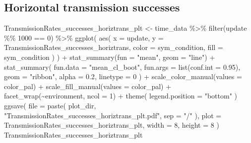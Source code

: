 \documentclass[
]{book}
\newenvironment{Shaded}{\begin{snugshade}}{\end{snugshade}}
\newcommand{\AttributeTok}[1]{\textcolor[rgb]{0.77,0.63,0.00}{#1}}
\newcommand{\DecValTok}[1]{\textcolor[rgb]{0.00,0.00,0.81}{#1}}
\newcommand{\FloatTok}[1]{\textcolor[rgb]{0.00,0.00,0.81}{#1}}
\newcommand{\FunctionTok}[1]{\textcolor[rgb]{0.00,0.00,0.00}{#1}}
\newcommand{\NormalTok}[1]{#1}
\newcommand{\OtherTok}[1]{\textcolor[rgb]{0.56,0.35,0.01}{#1}}
\newcommand{\SpecialCharTok}[1]{\textcolor[rgb]{0.00,0.00,0.00}{#1}}
\newcommand{\StringTok}[1]{\textcolor[rgb]{0.31,0.60,0.02}{#1}}
\begin{document}
\hypertarget{horizontal-transmission-successes-2}{%
\subsection{Horizontal transmission successes}\label{horizontal-transmission-successes-2}}

\begin{Shaded}
\begin{Highlighting}[]
\NormalTok{TransmissionRates\_successes\_horiztrans\_plt }\OtherTok{\textless{}{-}}\NormalTok{ time\_data }\SpecialCharTok{\%\textgreater{}\%}
  \FunctionTok{filter}\NormalTok{(update }\SpecialCharTok{\%\%} \DecValTok{1000} \SpecialCharTok{==} \DecValTok{0}\NormalTok{) }\SpecialCharTok{\%\textgreater{}\%}
  \FunctionTok{ggplot}\NormalTok{(}
    \FunctionTok{aes}\NormalTok{(}
      \AttributeTok{x =}\NormalTok{ update,}
      \AttributeTok{y =}\NormalTok{ TransmissionRates\_successes\_horiztrans,}
      \AttributeTok{color =}\NormalTok{ sym\_condition,}
      \AttributeTok{fill =}\NormalTok{ sym\_condition}
\NormalTok{    )}
\NormalTok{  ) }\SpecialCharTok{+}
  \FunctionTok{stat\_summary}\NormalTok{(}\AttributeTok{fun =} \StringTok{"mean"}\NormalTok{, }\AttributeTok{geom =} \StringTok{"line"}\NormalTok{) }\SpecialCharTok{+}
  \FunctionTok{stat\_summary}\NormalTok{(}
    \AttributeTok{fun.data =} \StringTok{"mean\_cl\_boot"}\NormalTok{,}
    \AttributeTok{fun.args =} \FunctionTok{list}\NormalTok{(}\AttributeTok{conf.int =} \FloatTok{0.95}\NormalTok{),}
    \AttributeTok{geom =} \StringTok{"ribbon"}\NormalTok{,}
    \AttributeTok{alpha =} \FloatTok{0.2}\NormalTok{,}
    \AttributeTok{linetype =} \DecValTok{0}
\NormalTok{  ) }\SpecialCharTok{+}
  \FunctionTok{scale\_color\_manual}\NormalTok{(}\AttributeTok{values =}\NormalTok{ color\_pal) }\SpecialCharTok{+}
  \FunctionTok{scale\_fill\_manual}\NormalTok{(}\AttributeTok{values =}\NormalTok{ color\_pal) }\SpecialCharTok{+}
  \FunctionTok{facet\_wrap}\NormalTok{(}\SpecialCharTok{\textasciitilde{}}\NormalTok{environment, }\AttributeTok{ncol =} \DecValTok{1}\NormalTok{) }\SpecialCharTok{+}
  \FunctionTok{theme}\NormalTok{(}
    \AttributeTok{legend.position =} \StringTok{"bottom"}
\NormalTok{  )}
\FunctionTok{ggsave}\NormalTok{(}
  \AttributeTok{file =} \FunctionTok{paste}\NormalTok{(}
\NormalTok{    plot\_dir,}
    \StringTok{"TransmissionRates\_successes\_horiztrans\_plt.pdf"}\NormalTok{,}
    \AttributeTok{sep =} \StringTok{"/"}
\NormalTok{  ),}
  \AttributeTok{plot =}\NormalTok{ TransmissionRates\_successes\_horiztrans\_plt,}
  \AttributeTok{width =} \DecValTok{8}\NormalTok{,}
  \AttributeTok{height =} \DecValTok{8}
\NormalTok{)}
\NormalTok{TransmissionRates\_successes\_horiztrans\_plt}
\end{Highlighting}
\end{Shaded}
\end{document}
